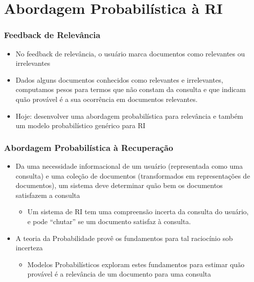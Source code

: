 \documentclass[compress]{beamer}
\def\myblue#1{\textcolor{texblue}{#1}}
\begin{document}
\section{Abordagem Probabilística à RI}
\begin{frame}[<+->]
\frametitle{Feedback de Relevância}
\pause[2]
\begin{itemize}
\item No feedback de relevância, o usuário marca documentos como relevantes ou irrelevantes
\item Dados alguns documentos conhecidos como relevantes e irrelevantes, computamos pesos para termos que não constam da consulta e que indicam quão provável é a sua ocorrência em documentos relevantes.
\item Hoje: desenvolver uma abordagem probabilística para relevância e também um modelo probabilístico genérico para RI
\end{itemize}
\end{frame}

\begin{frame}[<+->]
\frametitle{Abordagem Probabilística à Recuperação}
\pause[2]


\begin{itemize}
\item Da uma necessidade informacional de um usuário (representada como uma consulta) e uma coleção de documentos (transformados em representações de documentos), um sistema deve determinar quão bem os documentos satisfazem a consulta
\begin{itemize}

\item  Um sistema de RI tem uma \myblue{compreensão incerta} da consulta do usuário, e pode \myblue{``chutar''} se um documento satisfaz à consulta. 
\end{itemize}

\item A teoria da Probabilidade provê os fundamentos para tal \myblue{raciocínio sob incerteza} 
\begin{itemize}
\item Modelos Probabilísticos exploram estes fundamentos para estimar quão provável  é a relevância de um documento para uma consulta
\end{itemize}
\end{itemize}
\end{frame}
\end{document}
